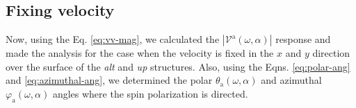 \documentclass[prb,11pt,tightenlines,twocolumn,aps]{revtex4-1}
\begin{document}
\subsection{Fixing velocity} %
\label{sec:res-fixvel}



{\color{red} Now, using the Eq. \eqref{eq:vv-mag}, we calculated the
$|\mathcal{V}^{\mathrm{a}}(\omega,\alpha)|$ response and made the analysis for
the case when the velocity is fixed in the $x$ and $y$ direction over the
surface of the \emph{alt} and \emph{up} structures. Also, using the Eqns.
\eqref{eq:polar-ang} and \eqref{eq:azimuthal-ang}, we determined the polar
$\theta_{\mathrm{a}}(\omega,\alpha)$ and azimuthal
$\varphi_{\mathrm{a}}(\omega,\alpha)$ angles where the spin polarization is
directed.}
\end{document}
